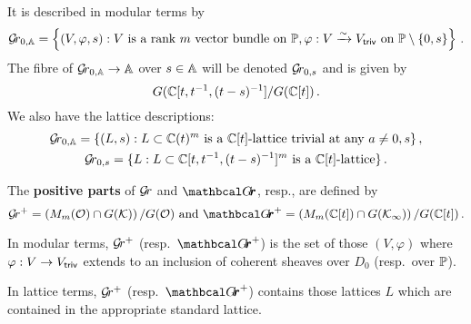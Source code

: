 \documentclass[draft]{article}
\begin{document}
It is described in modular terms by 
$$
    \Grbd = 
    \left\{ 
        (V,\varphi,s) : V\text{ is a rank $m$ vector bundle on }\PP, \varphi : V \xrightarrow{\sim} \Vtriv \text{ on } \PP \setminus \{0, s\}  
    \right\}\,. 
$$
The fibre of $\Grbd \to \AA$ over $ s \in \AA $ will be denoted $ \Gr_{0,s} $ and is given by
% 
$$ 
G(\CC[t, t^{-1}, (t-s)^{-1}]/G(\CC[t])\,. %
$$
% 
We also have the lattice descriptions:
% 
\begin{gather*}
\Grbd = 
\{ (L,s) :
L \subset  \CC(t)^m\text{ is a $\CC[t]$-lattice trivial at any }a \ne 0, s \}\,, \\
    \Gr_{0,s} = 
\{ L : L \subset  \CC[t,t^{-1},(t-s)^{-1}]^m \text{ is a $\CC[t]$-lattice} \}\,.
\end{gather*}
% 
\begin{definition} 
The \textbf{positive parts} of $\Gr $ and $\Grth$, resp., are defined by 
$$
    \Gr^+ = \left(M_m(\cO) \cap G(\cK)\right) / G(\cO) \text{ and }      
    {\Grth}^+ = \left(M_m(\CC[t]) \cap G(\Kinf)\right) / G(\CC[t])\,. 
$$
\end{definition}
In modular terms, $\Gr^+$ (resp.\ ${\Grth}^+$) is the set of those $ (V, \varphi)$ where $ \varphi : V \rightarrow \Vtriv $ extends to an inclusion of coherent sheaves over $ D_0 $ (resp.\ over $ \PP$).

In lattice terms, $ \Gr^+$ (resp.\ ${\Grth}^+$) contains those lattices $L$ which are contained in the appropriate standard lattice. 
\end{document}
